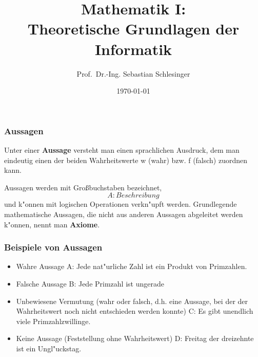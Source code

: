 \documentclass{beamer}
\title[Mathematik I]{Mathematik I: \\Theoretische Grundlagen der Informatik}
\author{Prof.\ Dr.-Ing. Sebastian Schlesinger}
\date{\today}
\begin{document}
 \begin{frame}
\titlepage
\end{frame}

 
\begin{frame}
\frametitle{Aussagen}

Unter einer \textbf{Aussage} versteht man einen sprachlichen Ausdruck, dem man eindeutig einen der beiden Wahrheitswerte w (\glqq wahr\grqq) bzw. f (\glqq falsch\grqq) zuordnen kann. 

Aussagen werden mit Gro\ss buchstaben bezeichnet, \[A:Beschreibung\]
und k"onnen mit logischen Operationen verkn"upft werden. Grundlegende mathematische Aussagen, die nicht aus anderen Aussagen abgeleitet werden k"onnen, nennt man \textbf{Axiome}.
\end{frame}

\begin{frame}
  \frametitle{Beispiele von Aussagen}
  \begin{itemize}
    \item Wahre Aussage A: Jede nat"urliche Zahl ist ein Produkt von Primzahlen.
    \item Falsche Aussage B: Jede Primzahl ist ungerade
    \item Unbewiesene Vermutung (wahr oder falsch, d.h. eine Aussage, bei der der Wahrheitswert noch nicht entschieden werden konnte) C: Es gibt unendlich viele Primzahlzwillinge.
    \item Keine Aussage (Feststellung ohne Wahrheitswert) D: Freitag der dreizehnte ist ein Ungl"uckstag.
  \end{itemize}
      
\end{frame}
\end{document}
